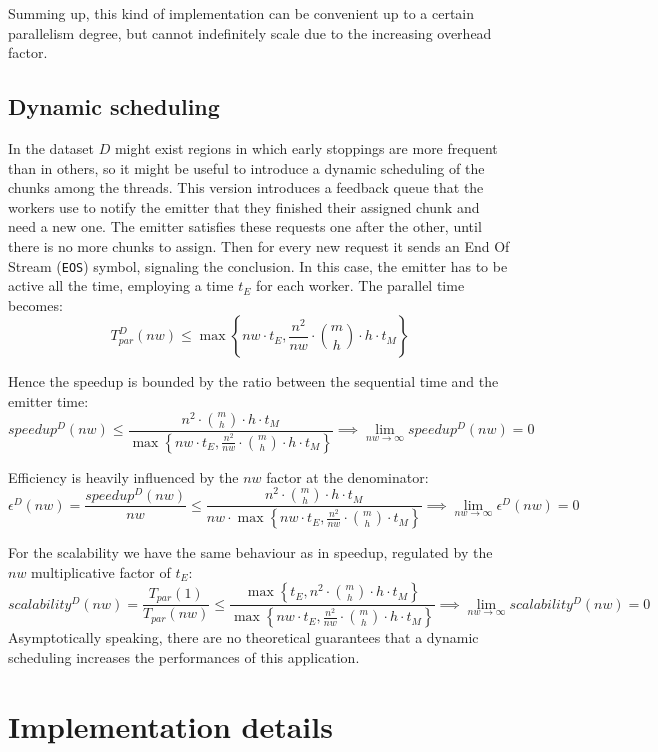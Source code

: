 \documentclass[a4paper]{article}
\begin{document}
Summing up, this kind of implementation can be convenient up to a certain parallelism degree, but cannot indefinitely scale due to the increasing overhead factor.

\subsection{Dynamic scheduling}

In the dataset $D$ might exist regions in which early stoppings are more frequent than in others, so it might be useful to introduce a dynamic scheduling of the chunks among the threads. This version introduces a feedback queue that the workers use to notify the emitter that they finished their assigned chunk and need a new one. The emitter satisfies these requests one after the other, until there is no more chunks to assign. Then for every new request it sends an End Of Stream (\texttt{EOS}) symbol, signaling the conclusion. In this case, the emitter has to be active all the time, employing a time $t_E$ for each worker. The parallel time becomes:
$$
    T_{par}^D(nw) \le \max \left \{ nw \cdot t_E, \frac{n^2}{nw} \cdot \binom{m}{h} \cdot h \cdot t_M \right \}
$$

Hence the speedup is bounded by the ratio between the sequential time and the emitter time:
$$
    speedup^D(nw) \le \frac{n^2 \cdot \binom{m}{h} \cdot h \cdot t_M}{\max \left \{ nw \cdot t_E, \frac{n^2}{nw} \cdot \binom{m}{h} \cdot h \cdot t_M \right \}} \implies \lim \limits_{nw \to \infty} speedup^D(nw) = 0
$$

Efficiency is heavily influenced by the $nw$ factor at the denominator:
$$
    \epsilon^D(nw) = \frac{speedup^D(nw)}{nw} \le \frac{n^2 \cdot \binom{m}{h} \cdot h \cdot t_M}{nw \cdot \max \left \{ nw \cdot t_E, \frac{n^2}{nw} \cdot \binom{m}{h} \cdot t_M \right \}} \implies \lim \limits_{nw \to \infty} \epsilon^D(nw) = 0
$$

For the scalability we have the same behaviour as in speedup, regulated by the $nw$ multiplicative factor of $t_E$:
$$
    scalability^D(nw) = \frac{T_{par}(1)}{T_{par}(nw)} \le \frac{\max \left \{ t_E, n^2 \cdot \binom{m}{h} \cdot h \cdot t_M \right \}}{\max \left \{ nw \cdot t_E, \frac{n^2}{nw} \cdot \binom{m}{h} \cdot h \cdot t_M \right \}} \implies \lim \limits_{nw \to \infty} scalability^D(nw) = 0
$$
Asymptotically speaking, there are no theoretical guarantees that a dynamic scheduling increases the performances of this application.

\section{Implementation details}
\end{document}
